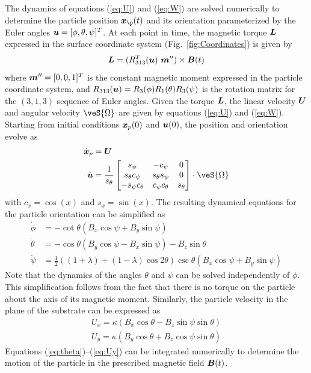 The dynamics of equations (\ref{eq:U}) and (\ref{eq:W}) are solved numerically to determine the particle position $\ve{x}_{\p}(t)$ and its orientation parameterized by the Euler angles  $\boldsymbol{u}=[\phi,\theta,\psi]^T$. At each point in time, the magnetic torque $\boldsymbol{L}$ expressed in the surface coordinate system (Fig.~\ref{fig:Coordinates}) is given by 
\begin{equation}
    \boldsymbol{L} = (R_{313}^{T}(\boldsymbol{u})~\boldsymbol{m}'')\times \boldsymbol{B}(t) \label{eq:Lm}
\end{equation}
where $\boldsymbol{m}''=[0,0,1]^T$ is the constant magnetic moment expressed in the particle coordinate system, and $R_{313}(\boldsymbol{u})=R_3(\phi)R_1(\theta)R_3(\psi)$ is the rotation matrix for the $(3,1,3)$ sequence of Euler angles.\cite{Diebel2006} Given the torque $\boldsymbol{L}$, the linear velocity $\boldsymbol{U}$ and angular velocity $\veS{\Omega}$ are given by equations (\ref{eq:U}) and (\ref{eq:W}). Starting from initial conditions $\boldsymbol{x}_p(0)$ and $\boldsymbol{u}(0)$, the position and orientation evolve as 
\begin{align}
    \dot{\ve{x}}_p &= \ve{U} \label{eq:position}
    \\
    \dot{\ve{u}} &= \frac{1}{s_{\theta}}\begin{bmatrix} 
     s_{\psi} & -c_{\psi} & 0
     \\
     s_{\theta} c_{\psi} & s_{\theta} s_{\psi} & 0
     \\
     -s_{\psi}c_{\theta} & c_{\psi}c_{\theta} & s_{\theta}
     \end{bmatrix} \cdot \veS{\Omega}
\end{align}
with $c_x =\cos(x)$ and $s_x=\sin(x)$.\cite{Diebel2006} The resulting dynamical equations for the particle orientation can be simplified as
\begin{align}
    \dot{\phi} &= -\cot \theta (B_x\cos\psi +B_y\sin\psi)
    \\
    \dot{\theta} &=  -\cos\theta (B_y \cos\psi - B_x \sin\psi) - B_z\sin\theta \label{eq:theta}
    \\
    \dot{\psi} &= \tfrac{1}{2} \left((1+\lambda) +(1-\lambda)\cos2\theta \right) \csc\theta (B_x \cos \psi + B_y\sin\psi ) \label{eq:psi}
\end{align}
Note that the dynamics of the angles $\theta$ and $\psi$ can be solved independently of $\phi$.  This simplification follows from the fact that there is no torque on the particle about the axis of its magnetic moment. Similarly, the particle velocity in the plane of the substrate can be expressed as
\begin{align}
    U_x = \kappa (B_x \cos \theta -  B_z \sin \psi \sin\theta) \label{eq:Ux}
    \\
    U_y = \kappa (B_y \cos\theta + B_z \cos\psi \sin\theta ) \label{eq:Uy}
\end{align}
Equations (\ref{eq:theta})--(\ref{eq:Uy}) can be integrated numerically to determine the motion of the particle in the prescribed magnetic field $\boldsymbol{B}(t)$.

